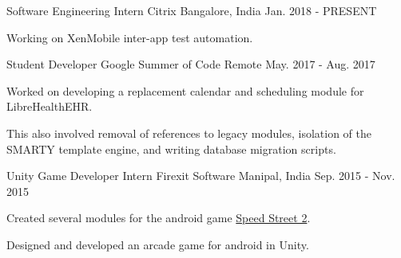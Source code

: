 

\begin{cventries}

  \cventry
    {Software Engineering Intern} %
    {Citrix} %
    {Bangalore, India} %
    {Jan. 2018 - PRESENT} %
    {
      \begin{cvitems} %
        \item {Working on XenMobile inter-app test automation.}
      \end{cvitems}
    }

  \cventry
    {Student Developer} %
    {Google Summer of Code} %
    {Remote} %
    {May. 2017 - Aug. 2017} %
    {
      \begin{cvitems} %
        \item {Worked on developing a replacement calendar and scheduling module for LibreHealthEHR.}
        \item {This also involved removal of references to legacy modules, isolation of the SMARTY template engine, and writing database migration scripts.}
      \end{cvitems}
    }

  \cventry
    {Unity Game Developer Intern} %
    {Firexit Software} %
    {Manipal, India} %
    {Sep. 2015 - Nov. 2015} %
    {
      \begin{cvitems} %
        \item {Created several modules for the android game {\href{https://play.google.com/store/apps/details?id=com.firexit.speedstreet2VRdemo}{Speed Street 2}}.}
        \item {Designed and developed an arcade game for android in Unity.}
      \end{cvitems}
    }

\end{cventries}

